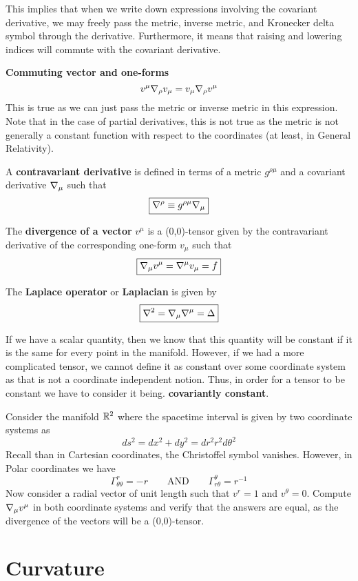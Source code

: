 \documentclass{article}
\begin{document}
 			This implies that when we write down expressions involving the covariant derivative, we may freely pass the metric, inverse metric, and Kronecker delta symbol through the derivative. Furthermore, it means that raising and lowering indices will commute with the covariant derivative. 
 			\begin{exmp}
 			 	\textbf{Commuting vector and one-forms}
 			 	$$ v^\mu \nabla_\rho v_\mu = v_\mu \nabla_\rho v^\mu$$
 			 	This is true as we can just pass the metric or inverse metric in this expression. Note that in the case of partial derivatives, this is not true as the metric is not generally a constant function with respect to the coordinates (at least, in General Relativity).
 			\end{exmp}
 			\begin{defn}
 				A \textbf{contravariant derivative} is defined in terms of a metric $g^{\rho\mu}$ and a covariant derivative $\nabla_\mu$ such that
 				\begin{equation}
 					\label{eq:ContravariantDerivative}
 					\boxed{\nabla^\rho \equiv g^{\rho\mu} \nabla_\mu}
 				\end{equation}
 			\end{defn}
 			\begin{defn}
 				The \textbf{divergence of a vector} $v^\mu$ is a (0,0)-tensor given by the contravariant derivative of the corresponding one-form $v_\mu$ such that
 				\begin{equation}
 					\label{eq:VectorDivergence}
 					\boxed{\nabla_\mu v^\mu = \nabla^\mu v_\mu = f}
 				\end{equation}
 			\end{defn}
 			\begin{defn}
 				The \textbf{Laplace operator} or \textbf{Laplacian} is given by
 				\begin{equation}
 					\label{eq:Laplacian}
 					\boxed{\nabla^2 = \nabla_\mu \nabla^\mu = \Delta }
 				\end{equation} 
 			\end{defn}
 			If we have a scalar quantity, then we know that this quantity will be constant if it is the same for every point in the manifold. However, if we had a more complicated tensor, we cannot define it as constant over some coordinate system as that is not a coordinate independent notion. Thus, in order for a tensor to be constant we have to consider it being. \textbf{covariantly constant}.
 			\begin{exe}
 				Consider the manifold $\mathbb{R}^2$ where the spacetime interval is given by two coordinate systems as
 				$$ ds^2 = dx^2 + dy^2 = dr^2 r^2 d\theta^2$$
 				Recall than in Cartesian coordinates, the Christoffel symbol vanishes. However, in Polar coordinates we have
 				$$ \Gamma_{\theta\theta}^r = -r \quad\quad \text{AND} \quad\quad \Gamma_{r\theta}^\theta = r^{-1}$$
 				Now consider a radial vector of unit length such that $v^r = 1$ and $v^\theta = 0$. Compute $\nabla_\mu v^\mu$ in both coordinate systems and verify that the answers are equal, as the divergence of the vectors will be a (0,0)-tensor.
 			\end{exe}
 	\pagebreak
 	\section{Curvature}
 		
\end{document}

